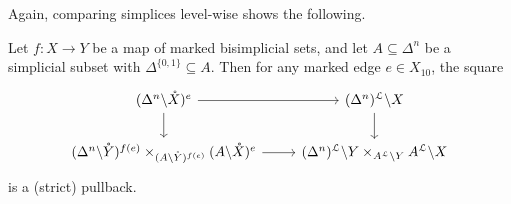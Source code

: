 \documentclass[main.tex]{subfiles}
\begin{document}
Again, comparing simplices level-wise shows the following.
\begin{lemma}
  \label{lemma:marked_pullback}
  Let $f\colon X \to Y$ be a map of marked bisimplicial sets, and let $A \subseteq \Delta^{n}$ be a simplicial subset with $\Delta^{\{0, 1\}} \subseteq A$. Then for any marked edge $e \in X_{10}$, the square
  \begin{equation*}
    \begin{tikzcd}
      (\Delta^{n} \backslash \mathring{X})^{e}
      \arrow[r]
      \arrow[d]
      & (\Delta^{n})^{\mathcal{L}} \backslash X
      \arrow[d]
      \\
      (\Delta^{n} \backslash \mathring{Y})^{f(e)} \times_{(A\backslash \mathring{Y})^{f(e)}} (A \backslash \mathring{X})^{e}
      \arrow[r]
      & (\Delta^{n})^{\mathcal{L}} \backslash Y \times_{A^{\mathcal{L}}\backslash Y} A^{\mathcal{L}} \backslash X
    \end{tikzcd}
  \end{equation*}
  is a (strict) pullback.
\end{lemma}
\end{document}

